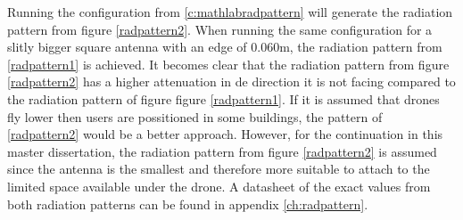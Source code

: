 Running the configuration from \ref{c:mathlabradpattern} will generate the radiation pattern from figure \ref{radpattern2}.
When running the same configuration for a slitly bigger square antenna with an edge of 0.060m, the radiation pattern from \ref{radpattern1} is
achieved. It becomes clear that the radiation pattern from figure \ref{radpattern2} has a higher attenuation in de direction it is not facing compared to
the radiation pattern of figure figure \ref{radpattern1}. If it is assumed that drones fly lower then users are possitioned in some buildings, the pattern of \ref{radpattern2}
would be a better approach. However, for the continuation in this master dissertation, the radiation pattern from figure \ref{radpattern2} is assumed since the antenna is the smallest
and therefore more suitable to attach to the limited space available under the drone. A datasheet of the exact values from both radiation patterns can be
found in appendix \ref{ch:radpattern}.


